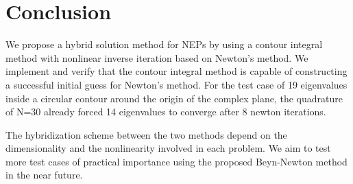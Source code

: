 \documentclass[11pt,letterpaper]{article}
\begin{document}
\section{Conclusion} 
We propose a hybrid solution method for NEPs by using a contour integral method with nonlinear inverse iteration based on Newton's method. We implement and verify that the contour integral method is capable of constructing a successful initial guess for Newton's method. For the test case of 19 eigenvalues inside a circular contour around the origin of the complex plane, the quadrature of N=30 already forced 14 eigenvalues to converge after 8 newton iterations.

The hybridization scheme between the two methods depend on the dimensionality and the nonlinearity involved in each problem. We aim to test more test cases of practical importance using the proposed Beyn-Newton method in the near future. 

%
%
%
\end{document}

